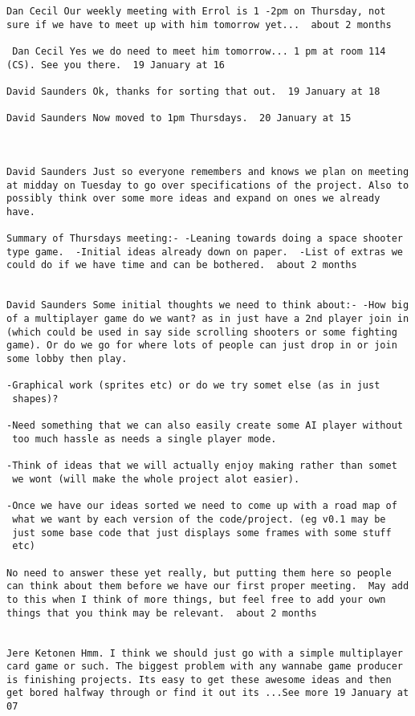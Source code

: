 \documentclass[10pt]{report}
\begin{document}
\begin{verbatim}
Dan Cecil Our weekly meeting with Errol is 1 -2pm on Thursday, not
sure if we have to meet up with him tomorrow yet...  about 2 months

 Dan Cecil Yes we do need to meet him tomorrow... 1 pm at room 114
(CS). See you there.  19 January at 16

David Saunders Ok, thanks for sorting that out.  19 January at 18

David Saunders Now moved to 1pm Thursdays.  20 January at 15



David Saunders Just so everyone remembers and knows we plan on meeting
at midday on Tuesday to go over specifications of the project. Also to
possibly think over some more ideas and expand on ones we already
have.

Summary of Thursdays meeting:- -Leaning towards doing a space shooter
type game.  -Initial ideas already down on paper.  -List of extras we
could do if we have time and can be bothered.  about 2 months 


David Saunders Some initial thoughts we need to think about:- -How big
of a multiplayer game do we want? as in just have a 2nd player join in
(which could be used in say side scrolling shooters or some fighting
game). Or do we go for where lots of people can just drop in or join
some lobby then play.

-Graphical work (sprites etc) or do we try somet else (as in just
 shapes)?

-Need something that we can also easily create some AI player without
 too much hassle as needs a single player mode.

-Think of ideas that we will actually enjoy making rather than somet
 we wont (will make the whole project alot easier).

-Once we have our ideas sorted we need to come up with a road map of
 what we want by each version of the code/project. (eg v0.1 may be
 just some base code that just displays some frames with some stuff
 etc)

No need to answer these yet really, but putting them here so people
can think about them before we have our first proper meeting.  May add
to this when I think of more things, but feel free to add your own
things that you think may be relevant.  about 2 months 
 

Jere Ketonen Hmm. I think we should just go with a simple multiplayer
card game or such. The biggest problem with any wannabe game producer
is finishing projects. Its easy to get these awesome ideas and then
get bored halfway through or find it out its ...See more 19 January at
07


\end{verbatim}
\end{document}
